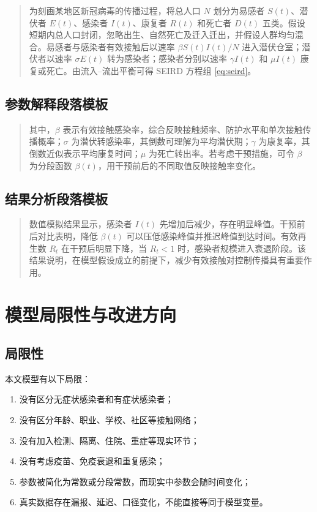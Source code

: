 \documentclass[UTF8,12pt,a4paper]{ctexart}
\begin{document}
\begin{quote}
为刻画某地区新冠病毒的传播过程，将总人口 $N$ 划分为易感者 $S(t)$、潜伏者 $E(t)$、感染者 $I(t)$、康复者 $R(t)$ 和死亡者 $D(t)$ 五类。假设短期内总人口封闭，忽略出生、自然死亡及迁入迁出，并假设人群均匀混合。易感者与感染者有效接触后以速率 $\beta S(t)I(t)/N$ 进入潜伏仓室；潜伏者以速率 $\sigma E(t)$ 转为感染者；感染者分别以速率 $\gamma I(t)$ 和 $\mu I(t)$ 康复或死亡。由流入--流出平衡可得 SEIRD 方程组 \eqref{eq:seird}。
\end{quote}

\subsection{参数解释段落模板}
\begin{quote}
其中，$\beta$ 表示有效接触感染率，综合反映接触频率、防护水平和单次接触传播概率；$\sigma$ 为潜伏转感染率，其倒数可理解为平均潜伏期；$\gamma$ 为康复率，其倒数近似表示平均康复时间；$\mu$ 为死亡转出率。若考虑干预措施，可令 $\beta$ 为分段函数 $\beta(t)$，用干预前后的不同取值反映接触率变化。
\end{quote}

\subsection{结果分析段落模板}
\begin{quote}
数值模拟结果显示，感染者 $I(t)$ 先增加后减少，存在明显峰值。干预前后对比表明，降低 $\beta(t)$ 可以压低感染峰值并推迟峰值到达时间。有效再生数 $R_t$ 在干预后明显下降，当 $R_t<1$ 时，感染者规模进入衰退阶段。该结果说明，在模型假设成立的前提下，减少有效接触对控制传播具有重要作用。
\end{quote}

\section{模型局限性与改进方向}
\subsection{局限性}
本文模型有以下局限：
\begin{enumerate}[label=\arabic*.]
\item 没有区分无症状感染者和有症状感染者；
\item 没有区分年龄、职业、学校、社区等接触网络；
\item 没有加入检测、隔离、住院、重症等现实环节；
\item 没有考虑疫苗、免疫衰退和重复感染；
\item 参数被简化为常数或分段常数，而现实中参数会随时间变化；
\item 真实数据存在漏报、延迟、口径变化，不能直接等同于模型变量。
\end{enumerate}
\end{document}
